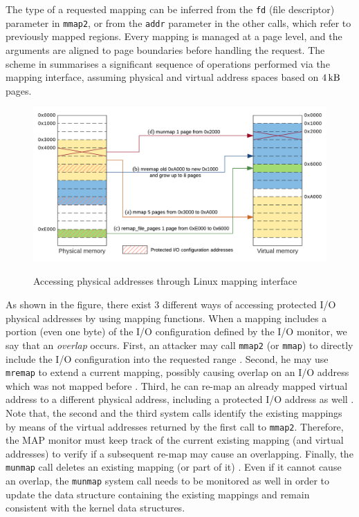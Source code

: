 The type of a requested mapping can be inferred from the \verb|fd| (file descriptor) parameter in \verb|mmap2|,
or from the \verb|addr| parameter in the other calls, which refer to previously mapped regions.
Every mapping is managed at a page level, and the arguments are aligned to page boundaries before handling the request.
The scheme in  summarises a significant sequence of operations performed via the mapping interface,
assuming physical and virtual address spaces based on $\SI{4}{\kilo\byte}$ pages.
\begin{figure}[h]
\centerline{
\includegraphics[width=\textwidth]{res/map_linux}}
\caption{Accessing physical addresses through Linux mapping interface \label{fig:map-linux}}
{\ignorespaces\label{fig:mmap}}
{\ignorespaces\label{fig:mremap}}
{\ignorespaces\label{fig:remapfp}}
{\ignorespaces\label{fig:munmap}}
\end{figure}
As shown in the figure, there exist $3$ different ways of accessing protected I/O physical addresses by using mapping functions.
When a mapping includes a portion (even one byte) of the I/O configuration defined by the I/O monitor, we say that an \emph{overlap} occurs.
First, an attacker may call \verb|mmap2| (or \verb|mmap|) to directly include the I/O configuration into the requested range .
Second, he may use \verb|mremap| to extend a current mapping, possibly causing overlap on an I/O address which was not mapped before .
Third, he can re-map an already mapped virtual address to a different physical address, including a protected I/O address as well .
Note that, the second and the third system calls identify the existing mappings by means of the virtual addresses returned by the first call to \verb|mmap2|.
Therefore, the MAP monitor must keep track of the current existing mapping (and virtual addresses) to verify if a subsequent re-map may cause an overlapping.
Finally, the \verb|munmap| call deletes an existing mapping (or part of it) . Even if it cannot cause an overlap,
the \verb|munmap| system call needs to be monitored as well in order to update the data structure containing the existing mappings and remain
consistent with the kernel data structures.

